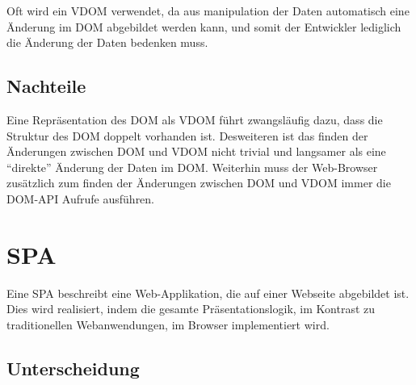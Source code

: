 Oft wird ein \ac{VDOM} verwendet, da aus manipulation der Daten automatisch eine
Änderung im \ac{DOM} abgebildet werden kann, und somit der Entwickler lediglich
die Änderung der Daten bedenken muss.

\subsection{Nachteile}

Eine Repräsentation des \ac{DOM} als \ac{VDOM} führt zwangsläufig dazu, dass die
Struktur des \ac{DOM} doppelt vorhanden ist. Desweiteren ist das finden der
Änderungen zwischen \ac{DOM} und \ac{VDOM} nicht trivial und langsamer als eine
``direkte'' Änderung der Daten im \ac{DOM}. Weiterhin muss der Web-Browser
zusätzlich zum finden der Änderungen zwischen \ac{DOM} und \ac{VDOM} immer
die \ac{DOM}-\ac{API} Aufrufe ausführen.

\section{\acl{SPA}}
Eine \ac{SPA} beschreibt eine Web-Applikation, die auf einer Webseite abgebildet ist. Dies wird realisiert, indem die gesamte Präsentationslogik, im Kontrast zu traditionellen Webanwendungen, im Browser implementiert wird.\cite{SPA} 
\subsection{Unterscheidung}

